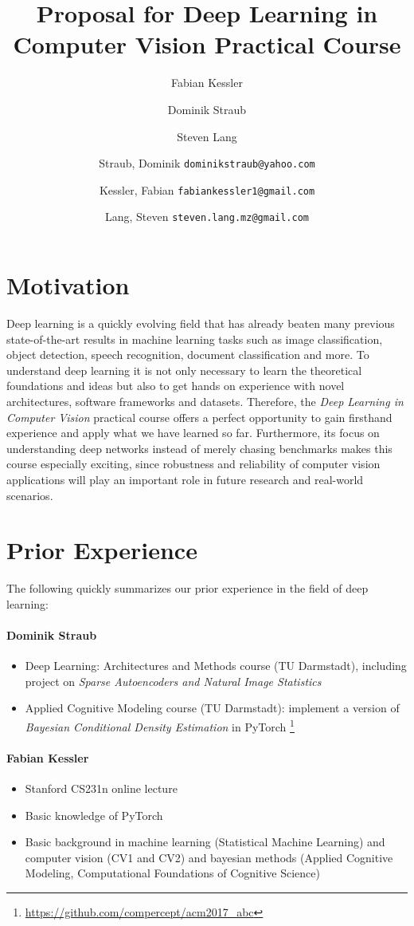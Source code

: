 \documentclass[11pt,english]{article}
\title{Proposal for Deep Learning in Computer Vision Practical Course}
\author{Fabian Kessler}
\author{Dominik Straub}
\author{Steven Lang}
\author{
	Straub, Dominik \texttt{dominikstraub@yahoo.com}
	\and
	Kessler, Fabian \texttt{fabiankessler1@gmail.com}
	\and
	Lang, Steven \texttt{steven.lang.mz@gmail.com}\\
}
\begin{document}
\maketitle
\section{Motivation}
Deep learning is a quickly evolving field that has already beaten many previous state-of-the-art results in machine learning tasks such as image classification, object detection, speech recognition, document classification and more. To understand deep learning it is not only necessary to learn the theoretical foundations and ideas but also to get hands on experience with novel architectures, software frameworks and datasets. Therefore, the \textit{Deep Learning in Computer Vision} practical course offers a perfect opportunity to gain firsthand experience and apply what we have learned so far. Furthermore, its focus on understanding deep networks instead of merely chasing benchmarks makes this course especially exciting, since robustness and reliability of computer vision applications will play an important role in future research and real-world scenarios.

\section{Prior Experience}
The following quickly summarizes our prior experience in the field of deep learning:

\paragraph{Dominik Straub}
\begin{itemize}
    \setlength\itemsep{-0.25em}
    \item Deep Learning: Architectures and Methods course (TU Darmstadt), including project on \textit{Sparse Autoencoders and Natural Image Statistics}
    \item Applied Cognitive Modeling course (TU Darmstadt): implement a version of \textit{Bayesian Conditional Density Estimation}\cite{Papamakarios2016} in PyTorch \footnote{\url{https://github.com/compercept/acm2017_abc}}
\end{itemize}
\paragraph{Fabian Kessler}
\begin{itemize}
    \setlength\itemsep{-0.25em}
    \item Stanford CS231n online lecture 
    \item Basic knowledge of PyTorch
    \item Basic background in machine learning (Statistical Machine Learning) and computer vision (CV1 and CV2) and bayesian methods (Applied Cognitive Modeling, Computational Foundations of Cognitive Science)
\end{itemize}
\end{document}

